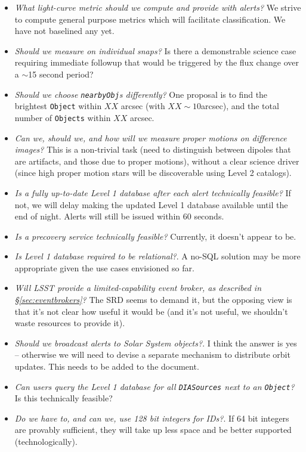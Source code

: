 \documentclass[12pt]{article}
\newcommand{\code}[1]{\texttt{#1}}
\newcommand{\DIASources}{\code{DIASources}\xspace}
\newcommand{\DB}{{Level 1 database}\xspace}
\newcommand{\Object}{\code{Object}\xspace}
\newcommand{\Objects}{\code{Objects}\xspace}
\begin{document}
\begin{itemize}
    \item {\em What light-curve metric should we compute and provide with alerts?} We strive to compute general purpose metrics which will facilitate classification. We have not baselined any yet.
    \item {\em Should we measure on individual snaps?} Is there a demonstrable science case requiring immediate followup that would be triggered by the flux change over a $\sim$15 second period?
    \item {\em Should we choose {\tt nearbyObj}s differently?} One proposal is to find the brightest \Object within $XX$ arcsec (with $XX \sim 10$arcsec), and the total number of \Objects within $XX$ arcsec.
    \item {\em Can we, should we, and how will we measure proper motions on difference images?} This is a non-trivial task (need to distinguish between dipoles that are artifacts, and those due to proper motions), without a clear science driver (since high proper motion stars will be discoverable using Level 2 catalogs).
    \item {\em Is a fully up-to-date \DB after each alert technically feasible?} If not, we will delay making the updated \DB available until the end of night. Alerts will still be issued within 60 seconds.
    \item {\em Is a precovery service technically feasible?} Currently, it doesn't appear to be.
    \item {\em Is \DB required to be relational?}. A no-SQL solution may be more appropriate given the use cases envisioned so far.
    \item {\em Will LSST provide a limited-capability event broker, as described in \S \ref{sec:eventbrokers}?} The SRD seems to demand it, but the opposing view is that it's not clear how useful it would be (and it's not useful, we shouldn't waste resources to provide it).
    \item {\em Should we broadcast alerts to Solar System objects?}. I think the answer is yes -- otherwise we will need to devise a separate mechanism to distribute orbit updates. This needs to be added to the document.
    \item {\em Can users query the \DB for all \DIASources next to an \Object?} Is this technically feasible?
    \item {\em Do we have to, and can we, use 128 bit integers for IDs?}. If 64 bit integers are provably sufficient, they will take up less space and be better supported (technologically).

\end{itemize}
\end{document}
